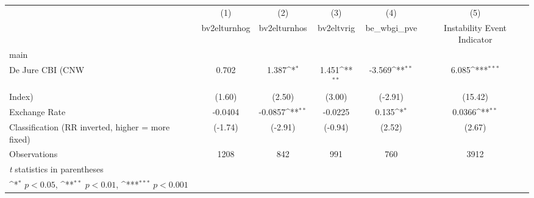 {
\def\sym#1{\ifmmode^{#1}\else\(^{#1}\)\fi}
\begin{tabular}{l*{5}{c}}
\toprule
                &\multicolumn{1}{c}{(1)}&\multicolumn{1}{c}{(2)}&\multicolumn{1}{c}{(3)}&\multicolumn{1}{c}{(4)}&\multicolumn{1}{c}{(5)}\\
                &\multicolumn{1}{c}{bv2elturnhog}&\multicolumn{1}{c}{bv2elturnhos}&\multicolumn{1}{c}{bv2eltvrig}&\multicolumn{1}{c}{be\_wbgi\_pve}&\multicolumn{1}{c}{Instability Event Indicator}\\
\midrule
main            &                  &                  &                  &                  &                  \\
De Jure CBI (CNW&    0.702         &    1.387\sym{*}  &    1.451\sym{**} &   -3.569\sym{**} &    6.085\sym{***}\\
Index)          &   (1.60)         &   (2.50)         &   (3.00)         &  (-2.91)         &  (15.42)         \\
\addlinespace
Exchange Rate   &  -0.0404         &  -0.0857\sym{**} &  -0.0225         &    0.135\sym{*}  &   0.0366\sym{**} \\
Classification (RR inverted, higher = more fixed)&  (-1.74)         &  (-2.91)         &  (-0.94)         &   (2.52)         &   (2.67)         \\
\midrule
Observations    &     1208         &      842         &      991         &      760         &     3912         \\
\bottomrule
\multicolumn{6}{l}{\footnotesize \textit{t} statistics in parentheses}\\
\multicolumn{6}{l}{\footnotesize \sym{*} \(p<0.05\), \sym{**} \(p<0.01\), \sym{***} \(p<0.001\)}\\
\end{tabular}
}
